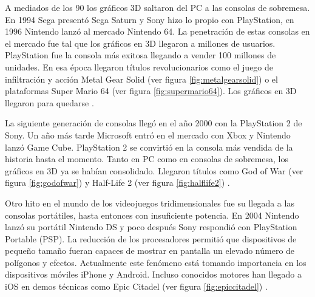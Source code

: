 
A mediados de los 90 los gráficos 3D saltaron del PC a las consolas de
sobremesa. En 1994 Sega presentó Sega Saturn y Sony hizo lo propio con
PlayStation, en 1996 Nintendo lanzó al mercado Nintendo 64. La penetración
de estas consolas en el mercado fue tal que los gráficos en 3D llegaron a
millones de usuarios. PlayStation fue la consola más exitosa llegando a vender
100 millones de unidades. En esa época llegaron títulos revolucionarios
como el juego de infiltración y acción Metal Gear Solid (ver
figura \ref{fig:metalgearsolid}) o el plataformas Super Mario 64 (ver figura
\ref{fig:supermario64}). Los gráficos en 3D llegaron para quedarse \cite{website:historia-videojuegos}.\\



La siguiente generación de consolas llegó en el año 2000 con la PlayStation 2
de Sony. Un año más tarde Microsoft entró en el mercado con Xbox y Nintendo
lanzó Game Cube. PlayStation 2 se convirtió en la consola más vendida de 
la historia hasta el momento. Tanto en PC como en consolas de sobremesa, los gráficos
en 3D ya se habían consolidado. Llegaron títulos como God of War (ver figura
\ref{fig:godofwar}) y Half-Life 2 (ver figura \ref{fig:halflife2}) \cite{website:historia-videojuegos}.\\



Otro hito en el mundo de los videojuegos tridimensionales fue su llegada
a las consolas portátiles, hasta entonces con insuficiente potencia. En 
2004 Nintendo lanzó su portátil Nintendo DS y poco después Sony respondió
con PlayStation Portable (PSP). La reducción de los procesadores permitió
que dispositivos de pequeño tamaño fueran capaces de mostrar en pantalla
un elevado número de polígonos y efectos. Actualmente este fenómeno está
tomando importancia en los dispositivos móviles iPhone y Android. Incluso
conocidos motores han llegado a iOS en demos técnicas como Epic Citadel
(ver figura \ref{fig:epiccitadel}) \cite{website:historia-videojuegos}.\\ 

